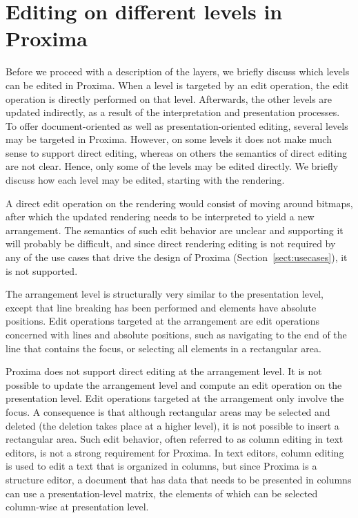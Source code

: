 %																
%																
%																
\section{Editing on different levels in Proxima}

Before we proceed with a description of the layers, we briefly discuss which levels can be edited in Proxima. When a level is targeted by an edit operation, the edit operation is directly performed on that level. Afterwards, the other levels are updated indirectly, as a result of the interpretation and presentation processes. To offer document-oriented as well as presentation-oriented editing, several levels may be targeted in Proxima. However, on some levels it does not make much sense to support direct editing, whereas on others the semantics of direct editing are not clear. Hence, only some of the levels may be edited directly. We briefly discuss how each level may be edited, starting with the rendering.


A direct edit operation on the rendering would consist of moving around bitmaps, after which the updated rendering needs to be interpreted to yield a new arrangement. The semantics of such edit behavior are unclear and supporting it will probably be difficult, and since direct rendering editing is not required by any of the use cases that drive the design of Proxima (Section~\ref{sect:usecases}), it is not supported.
  
  
\bc
The arrangement level is structurally very similar to the presentation level, except that line breaking has been performed and elements have absolute positions. Edit operations targeted at the arrangement are edit operations concerned with lines and absolute positions, such as navigating to the end of the line that contains the focus, or selecting all elements in a rectangular area.
\ec


Proxima does not support direct editing at the arrangement level. It is not possible to update the arrangement level and compute an edit operation on the presentation level. Edit operations targeted at the arrangement only involve the focus. A consequence is that although rectangular areas may be selected and deleted (the deletion takes place at a higher level), it is not possible to insert a rectangular area. Such edit behavior, often referred to as column editing in text editors, is not a strong requirement for Proxima. In text editors, column editing is used to edit a text that is organized in columns, but since Proxima is a structure editor, a document that has data that needs to be presented in columns can use a presentation-level matrix, the elements of which can be selected column-wise at presentation level.



